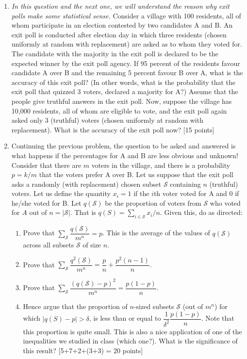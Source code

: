 \documentclass[11pt]{article}
\begin{document}
\begin{enumerate}
\item \textit{In this question and the next one, we will understand the reason why exit polls make some statistical sense.} Consider a village with 100 residents, all of whom participate in an election contested by two candidates A and B. An exit poll is conducted after election day in which three residents (chosen uniformly at random with replacement) are asked as to whom they voted for. The candidate with the majority in the exit poll is declared to be the expected winner by the exit poll agency. If 95 percent of the residents favour candidate A over B and the remaining 5 percent favour B over A, what is the accuracy of this exit poll? (In other words, what is the probability that the exit poll that quizzed 3 voters, declared a majority for A?) Assume that the people give truthful answers in the exit poll. Now, suppose the village has 10,000 residents, all of whom are eligible to vote, and the exit poll again asked only 3 (truthful) voters (chosen uniformly at random with replacement). What is the accuracy of the exit poll now? \textsf{[15 points]}

\item Continuing the previous problem, the question to be asked and answered is what happens if the percentages for A and B are less obvious and unknown! Consider that there are $m$ voters in the village, and there is a probability $p = k/m$ that the voters prefer A over B. Let us suppose that the exit poll asks a randomly (with replacement) chosen subset $\mathcal{S}$ containing $n$ (truthful) voters. Let us define the quantity $x_i = 1$ if the $i$th voter voted for A and 0 if he/she voted for B. Let $q(\mathcal{S})$ be the proportion of voters from $\mathcal{S}$ who voted for $A$ out of $n = |\mathcal{S}|$. 
That is $q(S) = \sum_{i \in \mathcal{S}} x_i/n$. Given this, do as directed:
\begin{enumerate}
\item Prove that $\sum_{\mathcal{S}}\dfrac{q(\mathcal{S})}{m^n} = p$. This is the average of the values of $q(\mathcal{S})$ across all subsets $\mathcal{S}$ of size $n$.
\item Prove that $\sum_{\mathcal{S}}\dfrac{q^2(\mathcal{S})}{m^n} = \dfrac{p}{n} + \dfrac{p^2(n-1)}{n}$.
\item Prove that $\sum_{\mathcal{S}}\dfrac{(q(\mathcal{S})-p)^2}{m^n} = \dfrac{p(1-p)}{n}$.
\item Hence argue that the proportion of $n$-sized subsets $\mathcal{S}$ (out of $m^n$) for which $|q(S)-p| > \delta$, is less than or equal to $\dfrac{1}{\delta^2}\dfrac{p(1-p)}{n}$. Note that this proportion is quite small. This is also a nice application of one of the inequalities we studied in class (which one?). What is the significance of this result? \textsf{[5+7+2+(3+3) = 20 points]}
\end{enumerate}

\end{enumerate}
\end{document}
